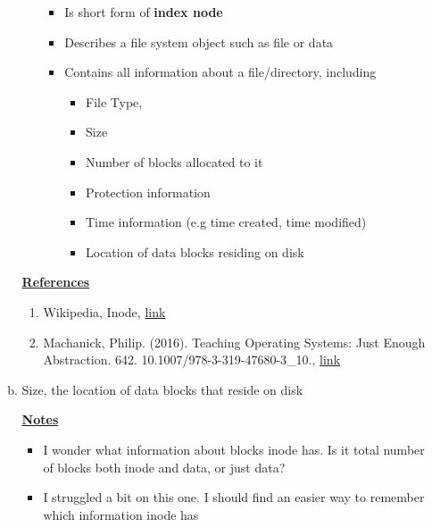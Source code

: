 \documentclass[12pt]{article}
\begin{document}
\begin{enumerate}[1.]
\begin{enumerate}[a)]
\begin{itemize}
            \begin{itemize}
                \item Is short form of \textbf{index node}
                \item Describes a file system object such as file or data
                \item Contains all information about a file/directory, including
                \begin{itemize}
                    \item File Type,
                    \item Size
                    \item Number of blocks allocated to it
                    \item Protection information
                    \item Time information (e.g time created, time modified)
                    \item Location of data blocks residing on disk
                \end{itemize}

            \end{itemize}
        \end{itemize}

        \bigskip

        \underline{\textbf{References}}

        \begin{enumerate}[1)]
            \item Wikipedia, Inode, \href{https://en.wikipedia.org/wiki/Inode}{link}
            \item Machanick, Philip. (2016). Teaching Operating Systems: Just Enough Abstraction. 642. 10.1007/978-3-319-47680-3\_10., \href{https://www.researchgate.net/figure/Conceptual-index-node-inode-The-top-level-block-contains-file-attributes-12-direct_fig1_306347325}{link}
        \end{enumerate}

        \item

        Size, the location of data blocks that reside on disk

        \bigskip

        \underline{\textbf{Notes}}

        \begin{itemize}
            \item I wonder what information about blocks inode has. Is it total number
            of blocks both inode and data, or just data?
            \item I struggled a bit on this one. I should find an easier way to
            remember which information inode has
        \end{itemize}


\end{enumerate}
\end{enumerate}
\end{document}
